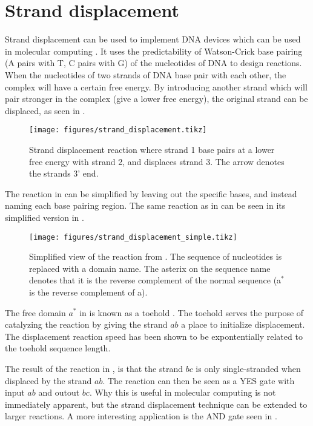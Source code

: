 \section{Strand displacement}

Strand displacement can be used to implement DNA devices which can be used in molecular computing \cite{Zhang2011}. It uses the predictability of Watson-Crick base pairing (A pairs with T, C pairs with G) of the nucleotides of DNA to design reactions. When the nucleotides of two strands of DNA base pair with each other, the complex will have a certain free energy. By introducing another strand which will pair stronger in the complex (give a lower free energy), the original strand can be displaced, as seen in .

\begin{figure}[H]
\centering
\texttt{[image: figures/strand\_displacement.tikz]}
\caption{Strand displacement reaction where strand 1 base pairs at a lower free energy with strand 2, and displaces strand 3. The arrow denotes the strands 3' end.}
\label{strand_displacement}
\end{figure}

The reaction in  can be simplified by leaving out the specific bases, and instead naming each base pairing region. The same reaction as in  can be seen in its simplified version in .

\begin{figure}[H]
\centering
\texttt{[image: figures/strand\_displacement\_simple.tikz]}
\caption{Simplified view of the reaction from . The sequence of nucleotides is replaced with a domain name. The asterix on the sequence name denotes that it is the reverse complement of the normal sequence (a$^*$ is the reverse complement of a).}
\label{strand_displacement_simple}
\end{figure}

The free domain $a^*$ in  is known as a toehold \cite{Zhang}. The toehold serves the purpose of catalyzing the reaction by giving the strand $ab$ a place to initialize displacement. The displacement reaction speed has been shown to be expontentially related to the toehold sequence length.

The result of the reaction in , is that the strand $bc$ is only single-stranded when displaced by the strand $ab$. The reaction can then be seen as a YES gate with input $ab$ and outout $bc$. Why this is useful in molecular computing is not immediately apparent, but the strand displacement technique can be extended to larger reactions. A more interesting application is the AND gate seen in .


